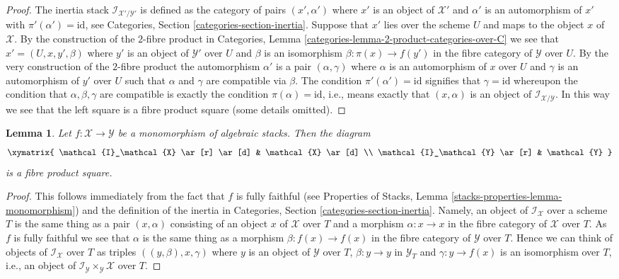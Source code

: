 \documentclass{stacks-project}
\theoremstyle{plain}
\newtheorem{lemma}[subsection]{Lemma}
\theoremstyle{definition}
\theoremstyle{remark}
\numberwithin{equation}{subsection}
\begin{document}
\begin{proof}
The inertia stack $\mathcal{I}_{\mathcal{X}'/\mathcal{Y}'}$ is defined as the
category of pairs $(x', \alpha')$ where $x'$ is an object of $\mathcal{X}'$
and $\alpha'$ is an automorphism of $x'$ with $\pi'(\alpha') = \text{id}$, see
Categories, Section \ref{categories-section-inertia}.
Suppose that $x'$ lies over the scheme $U$ and maps to the object
$x$ of $\mathcal{X}$. By the construction of the $2$-fibre product in
Categories, Lemma \ref{categories-lemma-2-product-categories-over-C}
we see that $x' = (U, x, y', \beta)$ where $y'$ is an object of $\mathcal{Y}'$
over $U$ and $\beta$ is an isomorphism
$\beta : \pi(x) \to f(y')$ in the fibre category of $\mathcal{Y}$ over $U$.
By the very construction of the $2$-fibre product the automorphism $\alpha'$
is a pair $(\alpha, \gamma)$ where $\alpha$ is an automorphism of $x$ over $U$
and $\gamma$ is an automorphism of $y'$ over $U$ such that
$\alpha$ and $\gamma$ are compatible via $\beta$. The condition
$\pi'(\alpha') = \text{id}$ signifies that $\gamma = \text{id}$
whereupon the condition that $\alpha, \beta, \gamma$ are compatible
is exactly the condition $\pi(\alpha) = \text{id}$, i.e., means
exactly that $(x, \alpha)$ is an object of
$\mathcal{I}_{\mathcal{X}/\mathcal{Y}}$.
In this way we see that the left square is a fibre product square
(some details omitted).
\end{proof}

\begin{lemma}
\label{lemma-monomorphism-cartesian-square-inertia}
Let $f : \mathcal{X} \to \mathcal{Y}$ be a monomorphism of algebraic stacks.
Then the diagram
$$
\xymatrix{
\mathcal{I}_\mathcal{X} \ar[r] \ar[d] &
\mathcal{X} \ar[d] \\
\mathcal{I}_\mathcal{Y} \ar[r] &
\mathcal{Y}
}
$$
is a fibre product square.
\end{lemma}

\begin{proof}
This follows immediately from the fact that $f$ is fully faithful (see
Properties of Stacks, Lemma \ref{stacks-properties-lemma-monomorphism})
and the definition of the inertia in
Categories, Section \ref{categories-section-inertia}.
Namely, an object of $\mathcal{I}_\mathcal{X}$ over a scheme $T$ is
the same thing as a pair $(x, \alpha)$ consisting of an object
$x$ of $\mathcal{X}$ over $T$ and a morphism $\alpha : x \to x$ in
the fibre category of $\mathcal{X}$ over $T$. As $f$ is fully faithful
we see that $\alpha$ is the same thing as a morphism
$\beta : f(x) \to f(x)$ in the fibre category of $\mathcal{Y}$ over $T$.
Hence we can think of objects of $\mathcal{I}_\mathcal{X}$ over $T$
as triples $((y, \beta), x, \gamma)$ where $y$ is an object of
$\mathcal{Y}$ over $T$, $\beta : y \to y$ in $\mathcal{Y}_T$ and
$\gamma : y \to f(x)$ is an isomorphism over $T$, i.e., an object
of $\mathcal{I}_\mathcal{Y} \times_\mathcal{Y} \mathcal{X}$ over $T$.
\end{proof}
\end{document}
